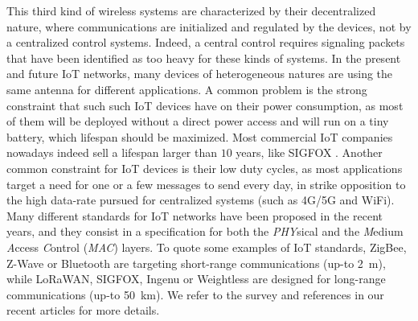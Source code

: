 This third kind of wireless systems are characterized by their decentralized nature,
where communications are initialized and regulated by the devices, not by a centralized control systems.
Indeed, a central control requires signaling packets that have been identified as too heavy for these kinds of systems.
In the present and future IoT networks, many devices of heterogeneous natures are using the same antenna for different applications.
A common problem is the strong constraint that such such IoT devices have on their power consumption, as most of them will be deployed without a direct power access and will run on a tiny battery, which lifespan should be maximized.
Most commercial IoT companies nowadays indeed sell a lifespan larger than $10$ years, like SIGFOX \cite{Centenaro16}.
Another common constraint for IoT devices is their low duty cycles, as most applications target a need for one or a few messages to send every day, in strike opposition to the high data-rate pursued for centralized systems (such as 4G/5G and WiFi).
%
Many different standards for IoT networks have been proposed in the recent years,
and they consist in a specification for both the \emph{PHY}sical
and the \emph{M}edium \emph{A}ccess \emph{C}ontrol (\emph{MAC}) layers.
To quote some examples of IoT standards, ZigBee, Z-Wave or Bluetooth are targeting short-range communications (up-to \SI{2}{\meter}), while LoRaWAN, SIGFOX, Ingenu or Weightless are designed for long-range communications (up-to \SI{50}{\kilo\meter}).
We refer to the survey \cite{Centenaro16} and references in our recent articles \cite{MoyBesson2019,MoyBesson2019Annales} for more details.



